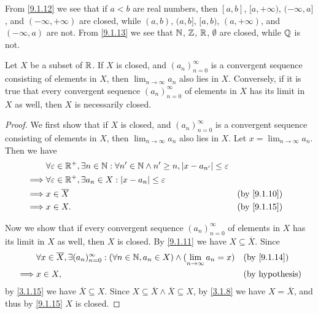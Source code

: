 \begin{eg}\label{9.1.16}
	From \cref{9.1.12} we see that if \(a < b\) are real numbers, then \([a, b]\), \([a, +\infty)\), \((-\infty, a]\), and \((-\infty, +\infty)\) are closed, while \((a, b)\), \((a, b]\), \([a, b)\), \((a, +\infty)\), and \((-\infty, a)\) are not.
	From \cref{9.1.13} we see that \(\mathbb{N}\), \(\mathbb{Z}\), \(\mathbb{R}\), \(\emptyset\) are closed, while \(\mathbb{Q}\) is not.
\end{eg}

\begin{cor}\label{9.1.17}
	Let \(X\) be a subset of \(\mathbb{R}\).
	If \(X\) is closed, and \((a_n)_{n = 0}^\infty\) is a convergent sequence consisting of elements in \(X\), then \(\lim_{n \to \infty} a_n\) also lies in \(X\).
	Conversely, if it is true that every convergent sequence \((a_n)_{n = 0}^\infty\) of elements in \(X\) has its limit in \(X\) as well, then \(X\) is necessarily closed.
\end{cor}

\begin{proof}
	We first show that if \(X\) is closed, and \((a_n)_{n = 0}^\infty\) is a convergent sequence consisting of elements in \(X\), then \(\lim_{n \to \infty} a_n\) also lies in \(X\).
	Let \(x = \lim_{n \to \infty} a_n\).
	Then we have
	\begin{align*}
		         & \forall \varepsilon \in \R^+, \exists n \in \N : \forall n' \in \N \land n' \geq n, \abs{x - a_{n'}} \leq \varepsilon                  \\
		\implies & \forall \varepsilon \in \R^+, \exists a_n \in X : \abs{x - a_n} \leq \varepsilon                                                       \\
		\implies & x \in \overline{X}                                                                                                    &  & \by{9.1.10} \\
		\implies & x \in X.                                                                                                              &  & \by{9.1.15}
	\end{align*}

	Now we show that if every convergent sequence \((a_n)_{n = 0}^\infty\) of elements in \(X\) has its limit in \(X\) as well, then \(X\) is closed.
	By \cref{9.1.11} we have \(X \subseteq \overline{X}\).
	Since
	\begin{align*}
		         & \forall x \in \overline{X}, \exists (a_n)_{n = 0}^\infty : (\forall n \in \N, a_n \in X) \land (\lim_{n \to \infty} a_n = x) &  & \by{9.1.14}            \\
		\implies & x \in X,                                                                                                                     &  & \text{(by hypothesis)}
	\end{align*}
	by \cref{3.1.15} we have \(\overline{X} \subseteq X\).
	Since \(X \subseteq \overline{X} \land \overline{X} \subseteq X\), by \cref{3.1.8} we have \(X = \overline{X}\), and thus by \cref{9.1.15} \(X\) is closed.
\end{proof}

